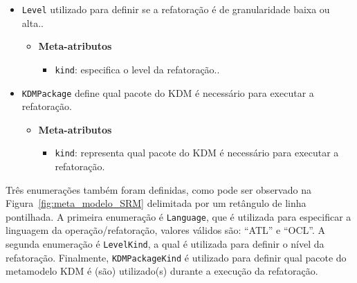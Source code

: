 \begin{itemize}
\item \texttt{Level} utilizado para definir se a refatoração é de granularidade baixa ou alta..

\begin{itemize}
	\item \textbf{Meta-atributos}
		\begin{itemize}
			\item \texttt{kind}: especifica o level da refatoração..
		\end{itemize}	
\end{itemize} 

\item \texttt{KDMPackage} define qual pacote do KDM é necessário para executar a refatoração.

\begin{itemize}
	\item \textbf{Meta-atributos}
		\begin{itemize}
			\item \texttt{kind}: representa qual pacote do KDM é necessário para executar a refatoração.
		\end{itemize}	
\end{itemize} 

\end{itemize}

Três enumerações também foram definidas, como pode ser observado na Figura~\ref{fig:meta_modelo_SRM} delimitada por um retângulo de linha pontilhada. A primeira enumeração é \texttt{Language}, que é utilizada para especificar a linguagem da operação/refatoração, valores válidos são: ``ATL'' e ``OCL''. A segunda enumeração é \texttt{LevelKind}, a qual é utilizada para definir o nível da refatoração. Finalmente, \texttt{KDMPackageKind} é utilizado para definir qual pacote do metamodelo KDM é (são) utilizado(s) durante a execução da refatoração. 





